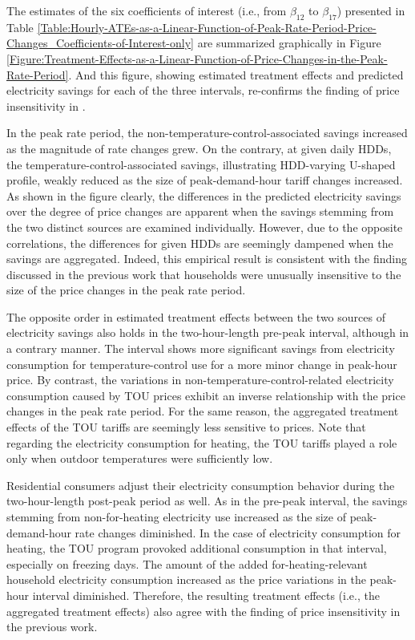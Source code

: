 The estimates of the six coefficients of interest (i.e., from $\beta_{12}$ to $\beta_{17}$) presented in Table \ref{Table:Hourly-ATEs-as-a-Linear-Function-of-Peak-Rate-Period-Price-Changes_Coefficients-of-Interest-only} are summarized graphically in Figure \ref{Figure:Treatment-Effects-as-a-Linear-Function-of-Price-Changes-in-the-Peak-Rate-Period}. And this figure, showing estimated treatment effects and predicted electricity savings for each of the three intervals, re-confirms the finding of price insensitivity in \cite{Peaking-Interest:How-Awareness-Drives-the-Effectiveness-of-Time-of-Use-Electricity-Pricing_Prest_2020}. 

In the peak rate period, the non-temperature-control-associated savings increased as the magnitude of rate changes grew. On the contrary, at given daily HDDs, the temperature-control-associated savings, illustrating HDD-varying U-shaped profile, weakly reduced as the size of peak-demand-hour tariff changes increased. As shown in the figure clearly, the differences in the predicted electricity savings over the degree of price changes are apparent when the savings stemming from the two distinct sources are examined individually. However, due to the opposite correlations, the differences for given HDDs are seemingly dampened when the savings are aggregated. Indeed, this empirical result is consistent with the finding discussed in the previous work that households were unusually insensitive to the size of the price changes in the peak rate period. 

The opposite order in estimated treatment effects between the two sources of electricity savings also holds in the two-hour-length pre-peak interval, although in a contrary manner. The interval shows more significant savings from electricity consumption for temperature-control use for a more minor change in peak-hour price. By contrast, the variations in non-temperature-control-related electricity consumption caused by TOU prices exhibit an inverse relationship with the price changes in the peak rate period. For the same reason, the aggregated treatment effects of the TOU tariffs are seemingly less sensitive to prices. Note that regarding the electricity consumption for heating, the TOU tariffs played a role only when outdoor temperatures were sufficiently low. 

Residential consumers adjust their electricity consumption behavior during the two-hour-length post-peak period as well. As in the pre-peak interval, the savings stemming from non-for-heating electricity use increased as the size of peak-demand-hour rate changes diminished. In the case of electricity consumption for heating, the TOU program provoked additional consumption in that interval, especially on freezing days. The amount of the added for-heating-relevant household electricity consumption increased as the price variations in the peak-hour interval diminished. Therefore, the resulting treatment effects (i.e., the aggregated treatment effects) also agree with the finding of price insensitivity in the previous work. 

